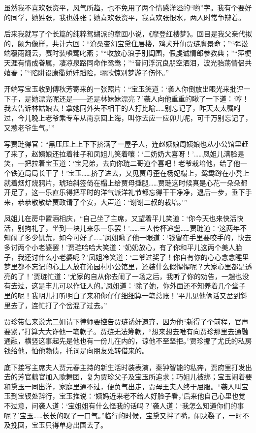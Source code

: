 \par 虽然我不喜欢张资平，风气所趋，也不免用了两个情感洋溢的“哟”字。我有个要好的同学，她姓张，我也姓张；她喜欢张资平，我喜欢张恨水，两人时常争辩着。
\par 后来我就写了个长篇的纯粹鸳蝴派的章回小说，《摩登红楼梦》。回目是我父亲代拟的，颇为像样，共计六回：“沧桑变幻宝黛住层楼，鸡犬升仙贾琏膺景命；”“弭讼端覆雨翻云，赛时装嗔莺叱燕；”“收放心浪子别闺围，假虔诚情郎参教典；”“萍梗天涯有情成眷属，凄凉泉路同命作鸳鸯；”“音问浮沉良朋空洒泪，波光骀荡情侣共嬉春；”“陷阱设康衢娇娃蹈险，骊歌惊别梦游子伤怀。”
\par 开端写宝玉收到傅秋芳寄来的一张照片：“宝玉笑道：‘袭人你倒放出眼光来批评一下子，是她漂亮呢还是——还是林妹妹漂亮？’袭人向他重重的瞅了一下道：‘哼！我去告诉林姑娘去！拿她同外头不相干的人打比喻……别忘记了，昨天太太嘱咐过，今儿晚上老爷乘专车从南京回上海，叫你去应一应卯儿呢，可千万别忘记了，又惹老爷生气。’”
\par 写贾琏得官：“黑压压上上下下挤满了一屋子人，连赵姨娘周姨娘也从小公馆里赶了来了，赵姨娘还拉着袖子和凤姐儿笑着嚷：‘二奶奶大喜呀！’……凤姐儿满脸是笑，一把拉着宝玉道：‘宝兄弟，去向你琏二哥道个喜吧！老爷栽培他，给了他一个铁道局局长干了！’宝玉……挤了进去，又见贾母歪在杨妃榻上，鸳鸯蹲在小凳上就着烟灯烧鸦片，琥珀斜签倚在榻上给贾母捶腿……贾琏这时候真是心花一朵朵都开足了，这一乐直乐得把平时的洋气派洋礼节都忘得干干净净，退后一步，垂下手来，恭恭敬敬给贾政请了个安，大声道：‘谢谢二叔的栽培。’”
\par 凤姐儿在房中置酒相庆，“自己坐了主席，又望着平儿笑道：‘你今天也来快活快活，别拘礼了，坐到一块儿来乐一乐罢！’……三人传杯递盏……贾琏道：‘这两年不知闹了多少饥荒，如今可好了……’凤姐瞅了他一眼道：‘钱留在手里要咬手的，快去多讨两个小老婆罢！’贾琏哈哈大笑道：‘奶奶放心，有了你和平儿这两个美人胎子，我还讨什么小老婆呢？’凤姐冷笑道：‘二爷过奖了！你自有你的心心念念睡里梦里都不忘记的心上人放在沁园村小公馆里，还装什么假惺惺呢？大家心里都是透亮的了！’贾琏忙道：‘尤家的自从你去闹了一场之后，我听了你的劝告，一趟也没有去过，这是丰儿可以作证人的。’凤姐道：‘除了她，你外面还不知养着几个堂子里的呢！我明儿打听明白了来和你仔仔细细算一笔总账！’平儿见他俩话又岔到斜里去了，连忙打了个岔混了过去。”
\par 贾珍带信来说尤二姐请下律师要控告贾琏诱奸遗弃，因为他“新得了个前程，官声要紧，”打算大大诈他一笔款子。贾琏无法筹款，“想来想去唯有向贾珍那里去通融通融，横竖这事起先是他也有一份儿在内的，谅他不至坚拒。”贾珍挪了尤氏的私房钱给他，怕他赖债，托词是向朋友处转借来的。
\par 底下接写主席夫人贾元春主持的新生活时装表演，秦钟智能的私奔，贾府里打发出去的芳官藕官加入歌舞团，复为贾珍父子及宝玉所追求；巧姐儿被绑；宝玉闹着要和黛玉一同出洋，家庭里通不过，便负气出走，贾母王夫人终于屈服。“袭人叫宝玉到宝钗处辞行，宝玉推说：‘姨妈近来老不给人好脸子看，’后来他自己心里也觉不过意，问袭人道：‘宝姐姐有什么怪我的话吗？’袭人道：‘我怎么知道你们的事呢？’宝玉……长长的叹了一口气。”临行的时候，宝黛又拌了嘴，闹决裂了，一时不及挽回，宝玉只得单身出国去了。
